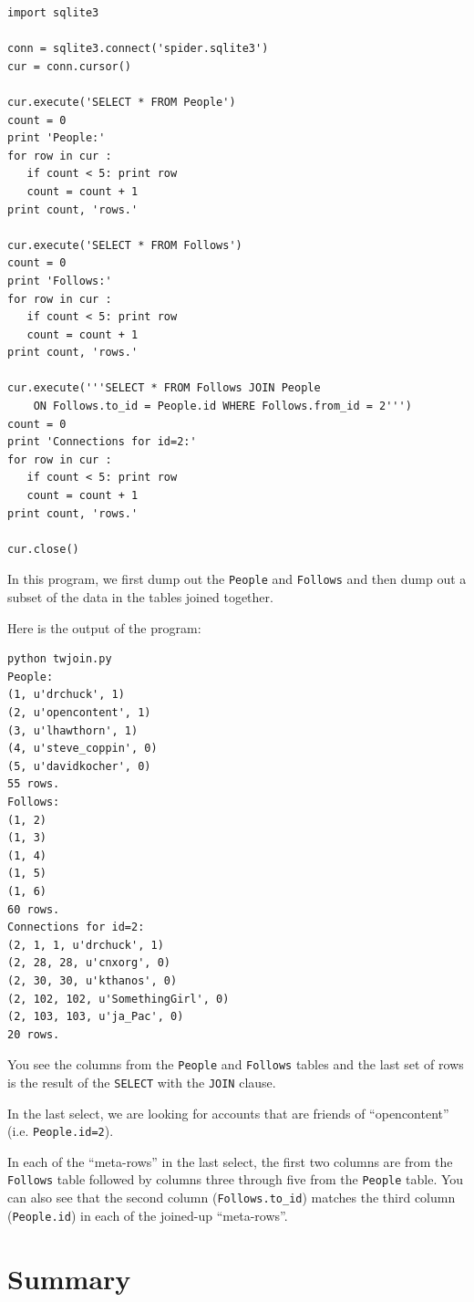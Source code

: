 \documentclass[11pt]{book}
\begin{document}
\beforeverb
\begin{verbatim}
import sqlite3

conn = sqlite3.connect('spider.sqlite3')
cur = conn.cursor()

cur.execute('SELECT * FROM People')
count = 0
print 'People:'
for row in cur :
   if count < 5: print row
   count = count + 1
print count, 'rows.'

cur.execute('SELECT * FROM Follows')
count = 0
print 'Follows:'
for row in cur :
   if count < 5: print row
   count = count + 1
print count, 'rows.'

cur.execute('''SELECT * FROM Follows JOIN People 
    ON Follows.to_id = People.id WHERE Follows.from_id = 2''')
count = 0
print 'Connections for id=2:'
for row in cur :
   if count < 5: print row
   count = count + 1
print count, 'rows.'

cur.close()
\end{verbatim}
\afterverb
%
In this program, we first dump out the {\tt People}
and {\tt Follows} and then dump out a subset of the
data in the tables joined together.

Here is the output of the program:

\beforeverb
\begin{verbatim}
python twjoin.py 
People:
(1, u'drchuck', 1)
(2, u'opencontent', 1)
(3, u'lhawthorn', 1)
(4, u'steve_coppin', 0)
(5, u'davidkocher', 0)
55 rows.
Follows:
(1, 2)
(1, 3)
(1, 4)
(1, 5)
(1, 6)
60 rows.
Connections for id=2:
(2, 1, 1, u'drchuck', 1)
(2, 28, 28, u'cnxorg', 0)
(2, 30, 30, u'kthanos', 0)
(2, 102, 102, u'SomethingGirl', 0)
(2, 103, 103, u'ja_Pac', 0)
20 rows.
\end{verbatim}
\afterverb
%
You see the columns from the {\tt People} and {\tt Follows} tables and the last
set of rows is the result of the {\tt SELECT} with the {\tt JOIN} clause.

In the last select, we are looking for accounts that are friends of 
``opencontent'' (i.e. {\tt People.id=2}).

In each of the ``meta-rows'' in the last select, the first two columns are
from the {\tt Follows}
table followed by columns three through five from the {\tt People} table.  You can also
see that the second column (\verb"Follows.to_id") matches the third column
({\tt People.id}) in each of the joined-up ``meta-rows''.

\section{Summary}
\end{document}

